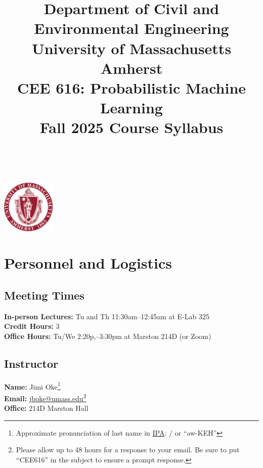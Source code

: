 \documentclass[11pt,twoside]{article}
\numberwithin{equation}{section}
\newcommand{\?}{\stackrel{?}{=}}
\begin{document}
 
\title{Department of Civil and Environmental Engineering\\ University of Massachusetts Amherst\\
  {\bf CEE 616: Probabilistic Machine Learning} \\
Fall 2025 {\sc Course Syllabus}
}
\date{}
\maketitle

\thispagestyle{empty}

\tableofcontents

~
\thispagestyle{empty}
\vfill
\begin{center}
  \includegraphics[width=1in]{umass_seal}
  

\end{center}

\eject
\section{Personnel and Logistics}

\subsection{Meeting Times}
\textbf{In-person Lectures:} Tu and Th 11:30am--12:45am at E-Lab 325\\
\textbf{Credit Hours:} 3\\
\textbf{Office Hours:} Tu/We 2:20p,--3:30pm at Marston 214D (or Zoom)

\subsection{Instructor}
\textbf{Name:}  Jimi Oke\footnote{Approximate  pronunciation of last name in \href{https://americanipachart.com/}{IPA}: / or ``aw-KEH''}\\
\textbf{Email:} \href{mailto:jimi@umass.edu}{jboke@umass.edu}\footnote{Please allow up to 48 hours for a response to your email. Be sure to put ``CEE616'' in the subject to ensure a prompt response.}\\
\textbf{Office:} 214D Marston Hall\\
\end{document}
